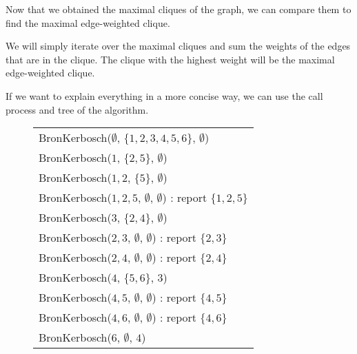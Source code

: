 Now that we obtained the maximal cliques of the graph, we can compare them to find
the maximal edge-weighted clique. \bigskip

We will simply iterate over the maximal cliques and sum the weights of the edges
that are in the clique. The clique with the highest weight will be the maximal
edge-weighted clique. \bigskip

\begin{minipage}{\linewidth}
    If we want to explain everything in a more concise way, we can use the call
    process and tree of the algorithm.
    \begin{figure}[H]
        \centering
        \begin{tabular}{|l|}
            \hline
            BronKerbosch($\emptyset$, $\{1,2,3,4,5,6\}$, $\emptyset$)                           \\
            \hspace{1em} BronKerbosch(${1}$, $\{2,5\}$, $\emptyset$)                            \\
            \hspace{2em} BronKerbosch(${1,2}$, $\{5\}$, $\emptyset$)                            \\
            \hspace{3em} BronKerbosch(${1,2,5}$, $\emptyset$, $\emptyset$) : report $\{1,2,5\}$ \\
            \hspace{1em} BronKerbosch(${3}$, $\{2,4\}$, $\emptyset$)                            \\
            \hspace{2em} BronKerbosch(${2,3}$, $\emptyset$, $\emptyset$) : report $\{2,3\}$     \\
            \hspace{2em} BronKerbosch(${2,4}$, $\emptyset$, $\emptyset$) : report $\{2,4\}$     \\
            \hspace{1em} BronKerbosch(${4}$, $\{5,6\}$, ${3}$)                                  \\
            \hspace{2em} BronKerbosch(${4,5}$, $\emptyset$, $\emptyset$) : report $\{4,5\}$     \\
            \hspace{2em} BronKerbosch(${4,6}$, $\emptyset$, $\emptyset$) : report $\{4,6\}$     \\
            \hspace{1em} BronKerbosch(${6}$, $\emptyset$, ${4}$)                                \\

\end{tabular}
\end{figure}
\end{minipage}
